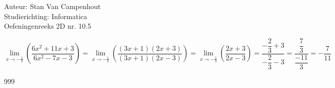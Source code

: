 \documentclass[a4paper]{article}
\begin{document}
  
\noindent \large Auteur: Stan Van Campenhout \\
\noindent \large Studierichting:  Informatica\\
\noindent \large Oefeningenreeks 2D nr. 10.5\\

\medskip

\normalsize

$ \lim\limits_{x \rightarrow -\tfrac{1}{3}} \left(\dfrac{6x^2 + 11x + 3}{6x^2 - 7x - 3} \right) 
= \lim\limits_{x \rightarrow -\tfrac{1}{3}} \left(\dfrac{(3x + 1)(2x + 3)}{(3x + 1)(2x - 3)} \right) 
= \lim\limits_{x \rightarrow -\tfrac{1}{3}} \left(\dfrac{2x + 3}{2x - 3} \right)  = \dfrac{-\dfrac{2}{3} + 3}{-\dfrac{2}{3} - 3}
= \dfrac{\dfrac{7}{3}}{\dfrac{-11}{3}} = -\dfrac{7}{11} $\\

\begin{thebibliography}{999}
\end{thebibliography}
\end{document}
